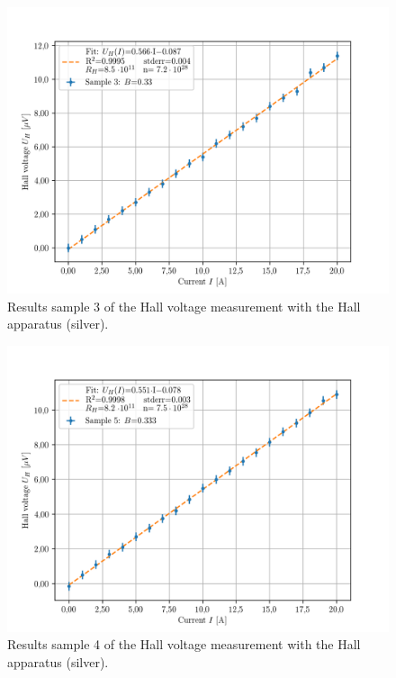     \begin{figure}[!htbp]
    \begin{center}
    \includegraphics[scale=0.8]{figuren/resultaten/sample3.png}
    \end{center}
    \caption{Results sample 3 of the Hall voltage measurement with the Hall apparatus (silver).}\label{fig:silver3}
    \end{figure}
    
    \begin{figure}[!htbp]
    \begin{center}
    \includegraphics[scale=0.8]{figuren/resultaten/sample5.png}
    \end{center}
    \caption{Results sample 4 of the Hall voltage measurement with the Hall apparatus (silver).}\label{fig:silver4}
    \end{figure}
    
